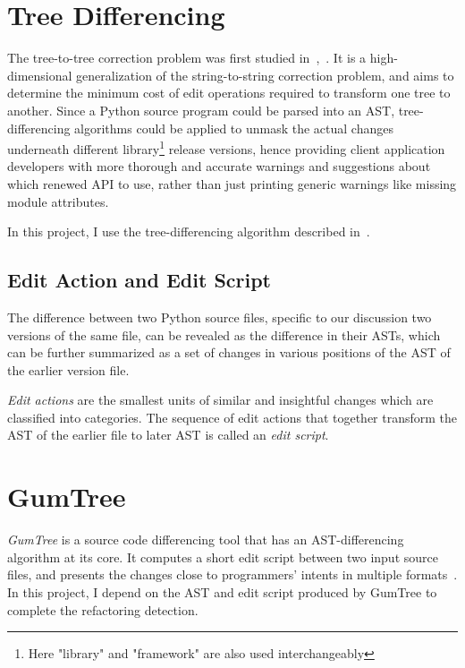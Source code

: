 \section{Tree Differencing}

The tree-to-tree correction problem was first studied in~\cite{tree-edit-p},~\cite{tree-correction-p}. It is a high-dimensional generalization of the string-to-string correction problem, and aims to determine the minimum cost of edit operations required to transform one tree to another. Since a Python source program could be parsed into an AST, tree-differencing algorithms could be applied to unmask the actual changes underneath different library\footnote{Here "library" and "framework" are also used interchangeably} release versions, hence providing client application developers with more thorough and accurate warnings and suggestions about which renewed API to use, rather than just printing generic warnings like missing module attributes.

In this project, I use the tree-differencing algorithm described in~\cite{DBLP:conf/kbse/FalleriMBMM14}.

\subsection{Edit Action and Edit Script}

The difference between two Python source files, specific to our discussion two versions of the same file, can be revealed as the difference in their ASTs, which can be further summarized as a set of changes in various positions of the AST of the earlier version file.

\textit{Edit actions} are the smallest units of similar and insightful changes which are classified into categories. The sequence of edit actions that together transform the AST of the earlier file to later AST is called an \textit{edit script}.

\section{GumTree}

\textit{GumTree} is a source code differencing tool that has an AST-differencing algorithm at its core. It computes a short edit script between two input source files, and presents the changes close to programmers' intents in multiple formats~\cite{DBLP:conf/kbse/FalleriMBMM14}. In this project, I depend on the AST and edit script produced by GumTree to complete the refactoring detection.

